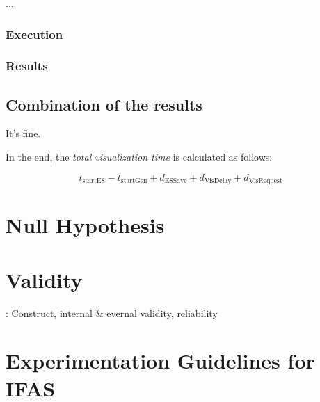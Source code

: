 ...

\subsubsection{Execution}

\subsubsection{Results}

\subsection{Combination of the results}
\label{subsec:evaluation:performance:insights}

It's fine.

In the end, the \emph{total visualization time} is calculated as follows:

$$t_\text{startES} - t_\text{startGen}+ d_\text{ESSave} + d_\text{VisDelay} + d_\text{VisRequest}$$


\section{Null Hypothesis}





\section{Validity}
\label{sec:evaluation:validity}

\cite{Easterbrook2008a}: Construct, internal \& evernal validity, reliability

\section{Experimentation Guidelines for IFAS}


